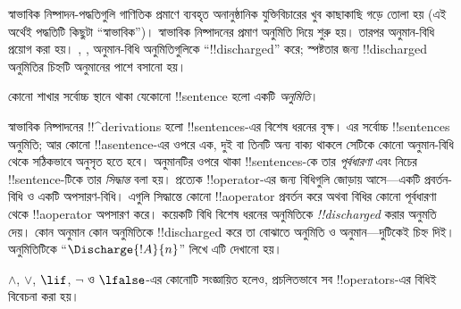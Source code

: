 \documentclass[../../../include/open-logic-section]{subfiles}
\begin{document}
      {}
      {}


\begin{explain}
স্বাভাবিক নিষ্পাদন-পদ্ধতিগুলি গাণিতিক প্রমাণে ব্যবহৃত অনানুষ্ঠানিক
যুক্তিবিচারের খুব কাছাকাছি গড়ে তোলা হয় (এই অর্থেই পদ্ধতিটি কিছুটা
``স্বাভাবিক'')। স্বাভাবিক নিষ্পাদনের প্রমাণ অনুমিতি দিয়ে শুরু হয়।
তারপর অনুমান-বিধি প্রয়োগ করা হয়। \Intro{\lnot}, \Intro{\lif},
অনুমান-বিধি অনুমিতিগুলিকে ``!!{discharged}'' করে; স্পষ্টতার জন্য
!!{discharged} অনুমিতির চিহ্নটি অনুমানের পাশে বসানো হয়।
\end{explain}

\begin{defn}[অনুমিতি]
কোনো শাখার সর্বোচ্চ স্থানে থাকা যেকোনো !!{sentence} হলো একটি
\emph{অনুমিতি}।
\end{defn}

স্বাভাবিক নিষ্পাদনের !!^{derivation}s হলো !!{sentence}s-এর বিশেষ ধরনের
বৃক্ষ। এর সর্বোচ্চ !!{sentence}s অনুমিতি; আর কোনো !!a{sentence}-এর
ওপরে এক, দুই বা তিনটি অন্য বাক্য থাকলে সেটিকে কোনো অনুমান-বিধি থেকে
সঠিকভাবে অনুসৃত হতে হবে। অনুমানটির ওপরে থাকা !!{sentence}s-কে তার
\emph{পূর্বধারণা} এবং নিচের !!{sentence}-টিকে তার \emph{সিদ্ধান্ত}
বলা হয়। প্রত্যেক !!{operator}-এর জন্য বিধিগুলি জোড়ায় আসে—একটি
প্রবর্তন-বিধি ও একটি অপসারণ-বিধি। এগুলি সিদ্ধান্তে কোনো
!!a{operator} প্রবর্তন করে অথবা বিধির কোনো পূর্বধারণা থেকে
!!a{operator} অপসারণ করে। কয়েকটি বিধি বিশেষ ধরনের অনুমিতিকে
\emph{!!{discharged}} করার অনুমতি দেয়। কোন অনুমান কোন অনুমিতিকে
!!{discharged} করে তা বোঝাতে অনুমিতি ও অনুমান—দুটিকেই চিহ্ন দিই।
অনুমিতিটিকে ``$\Discharge{!A}{n}$'' লিখে এটি দেখানো হয়।



%
	{$\land$, $\lor$, $\lif$, $\lnot$ ও $\lfalse$-এর কোনোটি সংজ্ঞায়িত হলেও, প্রচলিতভাবে সব !!{operator}s-এর বিধিই বিবেচনা করা হয়।}
\end{document}
